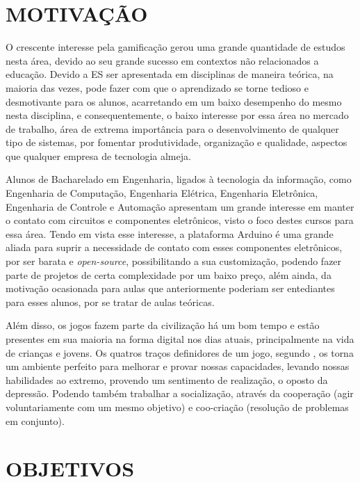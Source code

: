 \section{MOTIVAÇÃO}
\label{sec:motivacao}


O crescente interesse pela gamificação gerou uma grande quantidade de estudos nesta área, devido ao seu grande sucesso em contextos não relacionados a educação. Devido a ES ser apresentada em disciplinas de maneira teórica, na maioria das vezes, pode fazer com que o aprendizado se torne tedioso e desmotivante para os alunos, acarretando em um baixo desempenho do mesmo nesta disciplina, e consequentemente, o baixo interesse por essa área no mercado de trabalho, área de extrema importância para o desenvolvimento de qualquer tipo de sistemas, por fomentar produtividade, organização e qualidade, aspectos que qualquer empresa de tecnologia almeja.

Alunos de Bacharelado em Engenharia, ligados à tecnologia da informação, como Engenharia de Computação, Engenharia Elétrica, Engenharia Eletrônica, Engenharia de Controle e Automação apresentam um grande interesse em manter o contato com circuitos e componentes eletrônicos, visto o foco destes cursos para essa área. Tendo em vista esse interesse, a plataforma Arduino é uma grande aliada para suprir a necessidade de contato com esses componentes eletrônicos, por ser barata e \textit{open-source}, possibilitando a sua customização, podendo fazer parte de projetos de certa complexidade por um baixo preço, além ainda, da motivação ocasionada para aulas que anteriormente poderiam ser entediantes para esses alunos, por se tratar de aulas teóricas.

Além disso, os jogos fazem parte da civilização há um bom tempo \cite{Borges2014} e estão presentes em sua maioria na forma digital nos dias atuais, principalmente na vida de crianças e jovens. Os quatros traços definidores de um jogo, segundo \cite{McGonigal2011}, os torna um ambiente perfeito para melhorar e provar nossas capacidades, levando nossas habilidades ao extremo, provendo um sentimento de realização, o oposto da depressão. Podendo também trabalhar a socialização, através da  cooperação (agir voluntariamente com um mesmo objetivo) e coo-criação (resolução de problemas em conjunto).
  


\section{OBJETIVOS}
\label{sec:objetivos}

